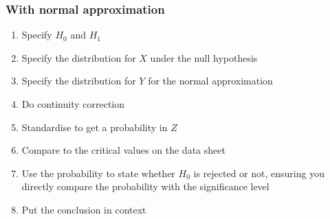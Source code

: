 \documentclass{article}[18pt]
\begin{document}
\subsubsection{With normal approximation}
\begin{enumerate}
\item Specify $H_0$ and $H_1$
\item Specify the distribution for $X$ under the null hypothesis
\item Specify the distribution for $Y$ for the normal approximation
\item Do continuity correction
\item Standardise to get a probability in $Z$
\item Compare to the critical values on the data sheet
\item Use the probability to state whether $H_0$ is rejected or not, ensuring you directly compare the probability with the significance level
\item Put the conclusion in context
\end{enumerate}
\end{document}
